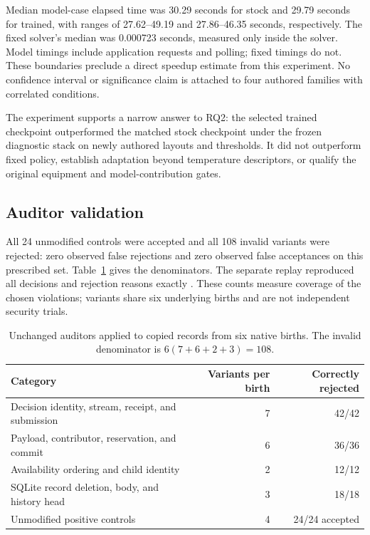 \documentclass[11pt,letterpaper]{article}
\begin{document}
Median model-case elapsed time was 30.29 seconds for stock and 29.79 seconds
for trained, with ranges of 27.62--49.19 and 27.86--46.35 seconds, respectively.
The fixed solver's median was 0.000723 seconds, measured only inside the solver.
Model timings include application requests and polling; fixed timings do not.
These boundaries preclude a direct speedup estimate from this experiment.
No confidence interval or significance claim is attached to four authored
families with correlated conditions.

The experiment supports a narrow answer to RQ2: the selected trained checkpoint
outperformed the matched stock checkpoint under the frozen diagnostic stack
on newly authored layouts and thresholds. It did not outperform fixed policy,
establish adaptation beyond temperature descriptors, or qualify the original
equipment and model-contribution gates.

\subsection{Auditor validation}
\label{sec:auditorresults}

All 24 unmodified controls were accepted and all 108 invalid variants were
rejected: zero observed false rejections and zero observed false acceptances
on this prescribed set. Table~\ref{tab:mutations} gives the denominators.
The separate replay reproduced all decisions and rejection reasons exactly
\cite{mutations}. These counts measure coverage of the chosen violations;
variants share six underlying births and are not independent security trials.

\begin{table}[htbp]
\centering\small
\caption{Unchanged auditors applied to copied records from six native births.
The invalid denominator is $6(7+6+2+3)=108$.}
\label{tab:mutations}
\begin{tabular}{@{}p{}rr@{}}
\toprule
Category & Variants per birth & Correctly rejected\\
\midrule
Decision identity, stream, receipt, and submission & 7 & 42/42\\
Payload, contributor, reservation, and commit & 6 & 36/36\\
Availability ordering and child identity & 2 & 12/12\\
SQLite record deletion, body, and history head & 3 & 18/18\\
\midrule
Unmodified positive controls & 4 & 24/24 accepted\\
\bottomrule
\end{tabular}
\end{table}
\end{document}
